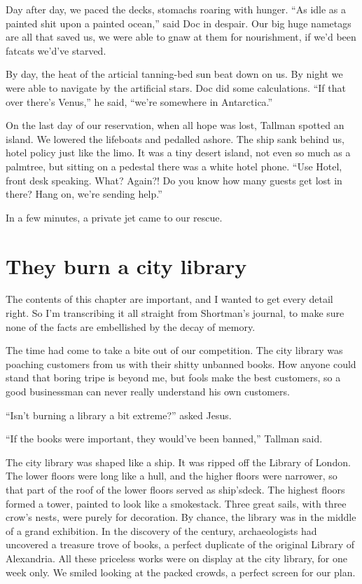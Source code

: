 \documentclass[oneside]{book}
\begin{document}
Day after day, we paced the decks, stomachs roaring with hunger.  ``As idle as a painted shit upon a painted
ocean,'' said Doc in despair.  Our big huge nametags are all that saved us,
we were able to gnaw at them for nourishment, if we'd been fatcats we'd've starved.

By day, the heat of the articial tanning-bed sun beat down on us.
By night we were able to navigate by the artificial stars.  Doc did some calculations.  ``If that over there's Venus,''
he said, ``we're somewhere in Antarctica.''

On the last day of our reservation,
when all hope was lost, Tallman spotted an island.  We lowered the lifeboats and pedalled ashore.  The ship sank behind us,
hotel policy just like the limo.
It was a tiny desert island, not even so much as a palmtree, but sitting on a pedestal there was a white hotel phone.
``Use Hotel, front desk speaking.  What?  Again?!  Do you know how many guests get lost in there?  Hang on,
we're sending help.''

In a few minutes, a private jet came to our rescue.

\chapter{They burn a city library}

The contents of this chapter are important, and I wanted to get every detail right.
So I'm transcribing it all straight from Shortman's journal, to make sure none of the facts
are embellished by the decay of memory.

The time had come to take a bite out of our competition.  The city library was poaching customers from us
with their shitty unbanned books.  How anyone could stand that boring tripe is beyond me, but fools make the
best customers, so a good businessman can never really understand his own customers.

``Isn't burning a library a bit extreme?'' asked Jesus.

``If the books were important, they would've been banned,'' Tallman said.

The city library was shaped like a ship.  It was ripped off the Library of London.
The lower floors were long like a hull, and the higher floors were narrower, so that part of the roof
of the lower floors served as ship'sdeck.  The highest floors formed a tower, painted to look like a
smokestack.  Three great sails, with three crow's nests, were purely for decoration.  By chance, the library
was in the middle of a grand exhibition.  In the discovery of the century, archaeologists had uncovered
a treasure trove of books, a perfect duplicate of the original Library of Alexandria.  All these priceless
works were on display at the city library, for one week only.  We smiled looking at the packed crowds,
a perfect screen for our plan.
\end{document}
